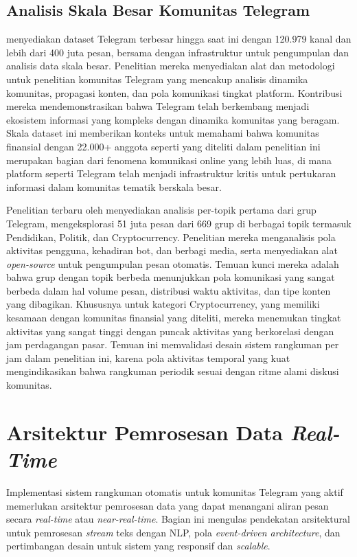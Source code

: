 \subsection{Analisis Skala Besar Komunitas Telegram}

\textcite{lamorgia2024} menyediakan dataset Telegram terbesar hingga saat ini dengan 120.979 kanal dan lebih dari 400 juta pesan, bersama dengan infrastruktur untuk pengumpulan dan analisis data skala besar. Penelitian mereka menyediakan alat dan metodologi untuk penelitian komunitas Telegram yang mencakup analisis dinamika komunitas, propagasi konten, dan pola komunikasi tingkat platform. Kontribusi mereka mendemonstrasikan bahwa Telegram telah berkembang menjadi ekosistem informasi yang kompleks dengan dinamika komunitas yang beragam. Skala dataset ini memberikan konteks untuk memahami bahwa komunitas finansial dengan 22.000+ anggota seperti yang diteliti dalam penelitian ini merupakan bagian dari fenomena komunikasi online yang lebih luas, di mana platform seperti Telegram telah menjadi infrastruktur kritis untuk pertukaran informasi dalam komunitas tematik berskala besar.

Penelitian terbaru oleh \textcite{perlo2025} menyediakan analisis per-topik pertama dari grup Telegram, mengeksplorasi 51 juta pesan dari 669 grup di berbagai topik termasuk Pendidikan, Politik, dan Cryptocurrency. Penelitian mereka menganalisis pola aktivitas pengguna, kehadiran bot, dan berbagi media, serta menyediakan alat \textit{open-source} untuk pengumpulan pesan otomatis. Temuan kunci mereka adalah bahwa grup dengan topik berbeda menunjukkan pola komunikasi yang sangat berbeda dalam hal volume pesan, distribusi waktu aktivitas, dan tipe konten yang dibagikan. Khususnya untuk kategori Cryptocurrency, yang memiliki kesamaan dengan komunitas finansial yang diteliti, mereka menemukan tingkat aktivitas yang sangat tinggi dengan puncak aktivitas yang berkorelasi dengan jam perdagangan pasar. Temuan ini memvalidasi desain sistem rangkuman per jam dalam penelitian ini, karena pola aktivitas temporal yang kuat mengindikasikan bahwa rangkuman periodik sesuai dengan ritme alami diskusi komunitas.

\section{Arsitektur Pemrosesan Data \textit{Real-Time}}
\label{sec:realtime-architecture}

Implementasi sistem rangkuman otomatis untuk komunitas Telegram yang aktif memerlukan arsitektur pemrosesan data yang dapat menangani aliran pesan secara \textit{real-time} atau \textit{near-real-time}. Bagian ini mengulas pendekatan arsitektural untuk pemrosesan \textit{stream} teks dengan NLP, pola \textit{event-driven architecture}, dan pertimbangan desain untuk sistem yang responsif dan \textit{scalable}.

